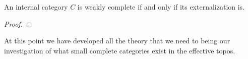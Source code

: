 \begin{thm}\label{thm:complete:completeexternalization}
  An internal category $C$ is weakly complete if and only if its
  externalization is.
\end{thm}
\begin{proof}

\end{proof}
At this point we have developed all the theory that we need to being
our investigation of what small complete categories exist in the
effective topos.

